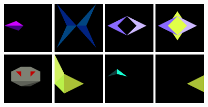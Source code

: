 \begin{figure}[H]
\includegraphics[width=2.5cm]{preface/obj2d/obj_24.png}
\includegraphics[width=2.5cm]{preface/obj2d/obj_25.png}
\includegraphics[width=2.5cm]{preface/obj2d/obj_26.png}
\includegraphics[width=2.5cm]{preface/obj2d/obj_27.png}
\includegraphics[width=2.5cm]{preface/obj2d/obj_28.png}
\includegraphics[width=2.5cm]{preface/obj2d/obj_29.png}
\includegraphics[width=2.5cm]{preface/obj2d/obj_3.png}
\includegraphics[width=2.5cm]{preface/obj2d/obj_30.png}

\end{figure}

